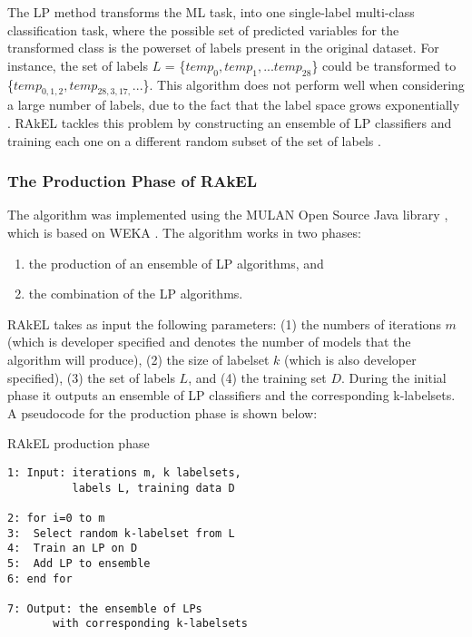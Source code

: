 \documentclass[11pt]{article}
\begin{document}
The LP method transforms the ML task, into 
one single-label multi-class classification task, where the possible set of predicted variables for the transformed class 
is the powerset of labels present in the original dataset. For instance, the set of 
labels $L$ = \{$temp_0, temp_1, ... temp_{28}$\} could be
transformed to
\{$temp_{0,1,2}, temp_{28,3,17,} ...$\}. This algorithm does not perform well when 
considering a large number of labels, due to the fact that the label space 
grows exponentially \cite{Tsoumakas:2007}. RAkEL tackles this problem by constructing an ensemble of 
LP classifiers and training each one on a different random subset of the set of labels \cite{Tsoumakas:2007}.

\subsubsection{The Production Phase of RAkEL}

The algorithm was implemented using the MULAN Open Source Java library \cite{mulan2011}, which is
 based on WEKA \cite{weka2005}. The algorithm works in two phases:
\begin{enumerate}
\item the production of an ensemble of LP algorithms, and
\item the combination of the LP algorithms. 
\end{enumerate}
RAkEL takes as input the following parameters: (1) the numbers of
iterations $m$ (which is developer specified and denotes the number of models 
that the algorithm will produce), (2) the size of labelset $k$ 
(which is also developer specified), (3) the set of labels $L$, 
and (4) the training set $D$. During the initial phase it outputs an ensemble of LP classifiers and the 
corresponding k-labelsets.
A pseudocode for the production phase is shown below:

    \begin{minipage}{0.45\textwidth}
      \begin{algorithm}[H]
        \caption{RAkEL production phase}
 \small
\begin{lstlisting}
1: Input: iterations m, k labelsets, 
          labels L, training data D

2: for i=0 to m
3:	Select random k-labelset from L
4:	Train an LP on D
5:	Add LP to ensemble
6: end for

7: Output: the ensemble of LPs
       with corresponding k-labelsets
\end{lstlisting}  
      \end{algorithm}
    \end{minipage}
\end{document}
